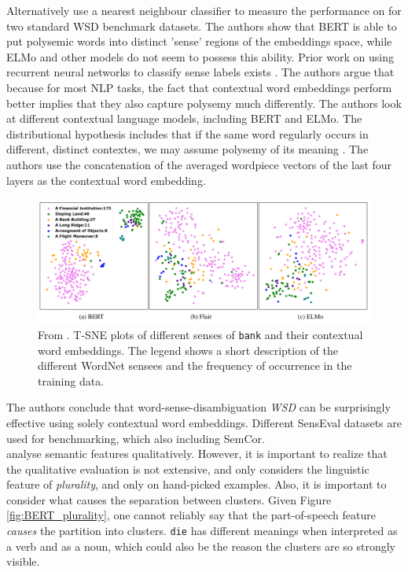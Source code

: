 \documentclass[a4paper,12pt,oneside,openright]{report}
\begin{document}
Alternatively \cite{wiedmann19} use a nearest neighbour classifier to measure the performance on  for two standard WSD benchmark datasets.
The authors show that BERT is able to put polysemic words into distinct 'sense' regions of the embeddings space, while ELMo and other models do not seem to possess this ability.
Prior work on using recurrent neural networks to classify sense labels exists \cite{kageback16}.
The authors argue that because for most NLP tasks, the fact that contextual word embeddings perform better implies that they also capture polysemy much differently.
The authors look at different contextual language models, including BERT and ELMo.
The distributional hypothesis includes that if the same word regularly occurs in different, distinct contextes, we may assume polysemy of its meaning \cite{miller91}.
The authors use the concatenation of the averaged wordpiece vectors of the last four layers as the contextual word embedding.

\begin{figure}[h]
	\center
  \includegraphics[width=0.9\linewidth]{./assets/relatedwork/wsd_bert.png}
  \caption{From \cite{wiedmann19}. T-SNE plots of different senses of \texttt{bank} and their contextual word embeddings. The legend shows a short description of the different WordNet sensees and the frequency of occurrence in the training data.
  }
  \label{fig:bert_wsd}
\end{figure}

The authors conclude that word-sense-disambiguation \textit{WSD} can be surprisingly effective using solely contextual word embeddings.
Different SensEval datasets are used for benchmarking, which also including SemCor. \\

\cite{coenen19} analyse semantic features qualitatively.
However, it is important to realize that the qualitative evaluation is not extensive, and only considers the linguistic feature of \textit{plurality}, and only on hand-picked examples.
Also, it is important to consider what causes the separation between clusters.
Given Figure \ref{fig:BERT_plurality}, one cannot reliably say that the part-of-speech feature \textit{causes} the partition into clusters.
\texttt{die} has different meanings when interpreted as a verb and as a noun, which could also be the reason the clusters are so strongly visible.
\end{document}
